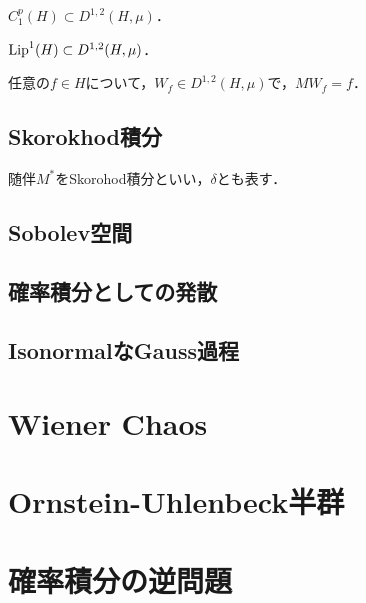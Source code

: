 \documentclass[uplatex,dvipdfmx]{jsreport}
\begin{document}
\begin{proposition}[$C^1$-級緩増加関数はMalliavin微分可能である]
    $C_1^p(H)\subset D^{1,2}(H,\mu)$．
\end{proposition}

\begin{proposition}[Lipschitz関数はMalliavin微分可能である]
    $\mathrm{Lip}^1(H)\subset D^{1,2}(H,\mu)$．
\end{proposition}

\begin{proposition}[微分積分学の基本定理?]
    任意の$f\in H$について，$W_f\in D^{1,2}(H,\mu)$で，$MW_f=f$．
\end{proposition}

\section{Skorokhod積分}

\begin{tcolorbox}[colframe=ForestGreen, colback=ForestGreen!10!white,breakable,colbacktitle=ForestGreen!40!white,coltitle=black,fonttitle=\bfseries\sffamily,
title=]
    随伴$M^*$をSkorohod積分といい，$\delta$とも表す．
\end{tcolorbox}

\section{Sobolev空間}

\section{確率積分としての発散}

\section{IsonormalなGauss過程}

\chapter{Wiener Chaos}

\chapter{Ornstein-Uhlenbeck半群}

\chapter{確率積分の逆問題}
\end{document}
